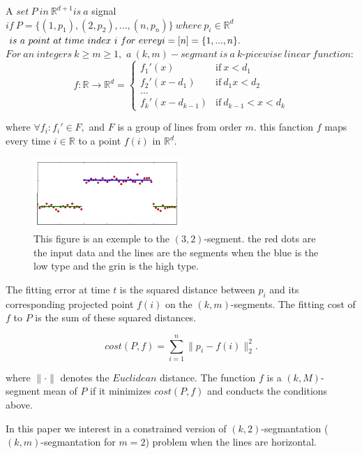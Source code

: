 \documentclass{vldb}
\begin{document}
\begin{definition}
A $set\ P\ in\ \mathbb{R}^{d+1} is\ a$ signal\\ 
$if\ P = \lbrace(1, p_1),(2, p_2),...,(n, p_n)\rbrace\ where\ p_i\in\mathbb{R}^d$ 
$is\ a\ point\ at\ time\ index\ i\ for\ evrey\\
i=[n]=\lbrace1,...,n\rbrace.$
$For\ an\ integers\ k\geq m\geq1,$
$a\ (k,m)-segmant\ is\ a\ k$-$picewise\ linear\ function:$
\[
f:\mathbb{R}\rightarrow\mathbb{R}^d = 
\begin{cases}
  \phantom{}f_1'(x) & \text{if}\ x<d_1 \\
  f_2'(x-d_1)        & \text{if}\ d_1x<d_2\\
  ...\\
  f_k'(x-d_{k-1})    & \text{if}\ d_{k-1}<x<d_k
\end{cases}
\]


where $\forall f_i : f_i' \in F,$ and $F$ is a group of lines from order $m$.
this fanction $f$ maps every time $i\in \mathbb{R}$ to a point $f(i)$ in $\mathbb{R}^d$.
\begin{figure}[H]

    \includegraphics[width=0.5\textwidth]{12.png}
      \caption{This figure is an exemple to the $(3,2)$-segment. the red dots are the input data and the lines are the segments when the blue is the low type and the grin is the high type. 
      }
  \centering
\end{figure}

The fitting error at time $t$ is the squared distance
between $p_i$ and its corresponding projected point $f(i)$ on the $(k,m)$-segments.
The fitting cost of $f$ to $P$ is the sum of these squared distances.

\[
cost(P,f) = \sum_{i=1}^{n}\parallel p_i-f(i)\parallel_{2}^{2}.
\]

where $\parallel\cdot\parallel$ denotes the $Euclidean$ distance. 
The function $f$ is a $(k,M)$-segment mean of $P$ if it minimizes $cost(P,f)$ and conducts the conditions above.
\end{definition}

In this paper we interest in a constrained version of $(k,2)$-segmantation
($(k,m)$-segmantation for $m=2$) problem when the lines are horizontal.
\end{document}
